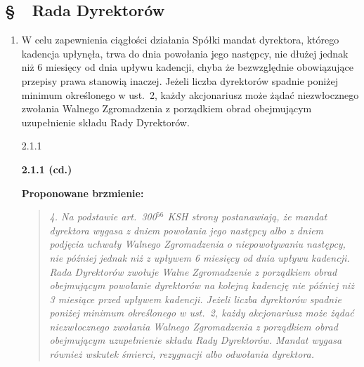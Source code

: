 \documentclass[12pt,a4paper]{report}
\newcounter{paragraf}
\newcommand{\paragraf}[1]{%
  \refstepcounter{paragraf}%
  \phantomsection%
  \addcontentsline{toc}{section}{\S~\theparagraf\ #1}%
  \Needspace{6\baselineskip}%
  \subsection*{\S~\theparagraf\ #1}%
}
\newenvironment{ContractClause}[1]{%
  \paragraf{#1}%
}{%
  \par
}
\newcommand{\MemoPytCd}[1]{\par\noindent\textbf{#1 (cd.)}\par\smallskip}
\newcommand{\Wiar}[1]{\textbf{[#1]}}
\newcommand{\Kierunek}[1]{\textbf{Kierunek i konsekwencje.} #1\par}
\newenvironment{Brzmienie}{\par\textbf{Proponowane brzmienie:}\begin{quote}\itshape}{\end{quote}}
\begin{document}
\begin{ContractClause}{Rada Dyrektorów}
\begin{enumerate}
\begin{MemoBox}{4.4.2}
\MemoPytCd{4.4.2}
\Kierunek{(V)~Wyjątek dla dyrektora inwestora (A.5; zależnie od decyzji Założycieli o~kręgu inwestorów): za zgodą Walnego Zgromadzenia 75\% (jak przy nabywcy), jedna osoba, z~zachowaniem większości Rady spełniającej Kryterium i~z~dostępem do Kluczowej Własności Intelektualnej wyłącznie w~trybie §~\ref{art:security} ust.~6. Do sprawdzenia, czy przepisy koncesyjne (ustawa z~2019~r. o~wytwarzaniu i~obrocie bronią) albo wymogi zamawiających nie stawiają dyrektorom wymogów obywatelstwa, które wyjątek by naruszał \Wiar{?}. Nowe zdanie ostatnie ust.~3:}
\begin{Brzmienie}
Walne Zgromadzenie może, uchwałą podjętą większością 75\% wszystkich głosów, powołać jednego dyrektora niewykonawczego niespełniającego Kryterium Bezpieczeństwa EU/NATO, wskazanego przez akcjonariusza będącego Kwalifikowanym Inwestorem Finansowym na podstawie §~\ref{art:kwalifikowana-runda} ust.~4 lit.~c, jeżeli osoba ta nie jest Niedopuszczalnym Nabywcą ani obywatelem lub rezydentem państwa objętego bezwzględnie obowiązującymi środkami ograniczającymi, większość dyrektorów, w tym Przewodniczący i każdy dyrektor wykonawczy, spełnia Kryterium, a dostęp tej osoby do Kluczowej Własności Intelektualnej i informacji objętych kontrolą eksportu następuje wyłącznie w trybie §~\ref{art:security} ust.~6 i §~\ref{art:export}; regulamin Rady Dyrektorów określa zakres wyłączenia tej osoby z dostępu do informacji i z głosowania w sprawach objętych tymi ograniczeniami.
\end{Brzmienie}
\end{MemoBox}

\item W celu zapewnienia ciągłości działania Spółki mandat dyrektora, którego kadencja upłynęła, trwa do dnia powołania jego następcy, nie dłużej jednak niż 6 miesięcy od dnia upływu kadencji, chyba że bezwzględnie obowiązujące przepisy prawa stanowią inaczej. Jeżeli liczba dyrektorów spadnie poniżej minimum określonego w ust.~2, każdy akcjonariusz może żądać niezwłocznego zwołania Walnego Zgromadzenia z porządkiem obrad obejmującym uzupełnienie składu Rady Dyrektorów.
  
\begin{MemoBox}{2.1.1}
\MemoPytCd{2.1.1}
\begin{Brzmienie}
4. Na podstawie art.~300$^{56}$ KSH strony postanawiają, że mandat dyrektora wygasa z dniem powołania jego następcy albo z dniem podjęcia uchwały Walnego Zgromadzenia o niepowoływaniu następcy, nie później jednak niż z upływem 6 miesięcy od dnia upływu kadencji. Rada Dyrektorów zwołuje Walne Zgromadzenie z porządkiem obrad obejmującym powołanie dyrektorów na kolejną kadencję nie później niż 3 miesiące przed upływem kadencji. Jeżeli liczba dyrektorów spadnie poniżej minimum określonego w ust.~2, każdy akcjonariusz może żądać niezwłocznego zwołania Walnego Zgromadzenia z porządkiem obrad obejmującym uzupełnienie składu Rady Dyrektorów. Mandat wygasa również wskutek śmierci, rezygnacji albo odwołania dyrektora.
\end{Brzmienie}
\end{MemoBox}


\end{enumerate}
\end{ContractClause}
\end{document}

